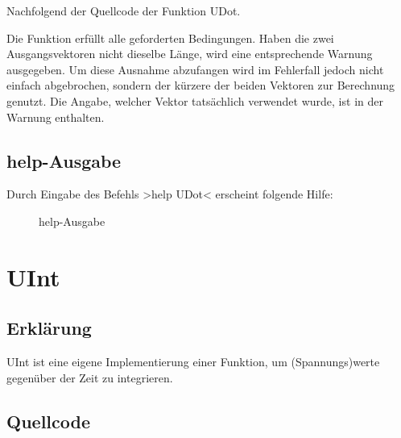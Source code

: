 \documentclass[%
  a4paper, %
  12pt, %
   article, %
  titlepage
]{scrartcl}
\begin{document}
\lstset{style=mystyle}

Nachfolgend der Quellcode der Funktion UDot.
 


\newpage

Die Funktion erfüllt alle geforderten Bedingungen. Haben die zwei Ausgangsvektoren nicht dieselbe Länge, wird eine entsprechende Warnung ausgegeben.
Um diese Ausnahme abzufangen wird im Fehlerfall jedoch nicht einfach abgebrochen, sondern der kürzere der beiden Vektoren zur Berechnung genutzt.
Die Angabe, welcher Vektor tatsächlich verwendet wurde, ist in der Warnung enthalten.

 \subsection{help-Ausgabe}

Durch Eingabe des Befehls >help UDot< erscheint folgende Hilfe:

\begin{figure}[h]
\caption{help-Ausgabe}
\label{fig1}
\end{figure}



  \section{UInt}
  \subsection{Erklärung}

UInt ist eine eigene Implementierung einer Funktion, um (Spannungs)werte gegenüber der Zeit zu integrieren.


\newpage

 \subsection{Quellcode}
\end{document}
